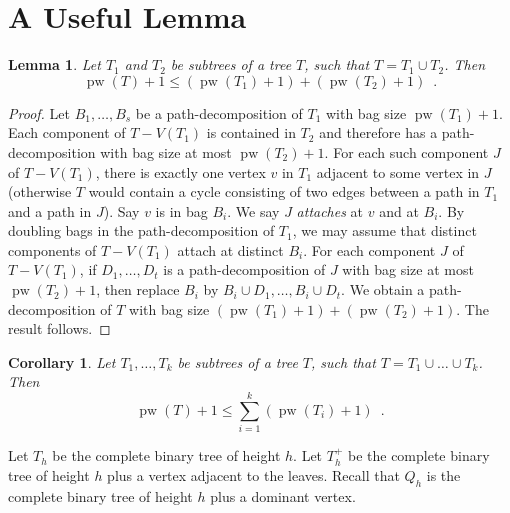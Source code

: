 \documentclass[a4paper,11pt]{article}
\DeclareMathOperator{\pw}{pw}
\theoremstyle{plain}
\newtheorem{lemma}[theorem]{Lemma}
\newtheorem{corollary}[theorem]{Corollary}
\theoremstyle{definition}
\begin{document}
%
%

\section{A Useful Lemma}

\begin{lemma}
Let $T_1$ and $T_2$ be subtrees of a tree $T$, such that $T=T_1\cup T_2$. Then 
$$\pw(T)+1\leq(\pw(T_1)+1)+(\pw(T_2)+1)\enspace.$$
\end{lemma}

\begin{proof}
Let $B_1,\dots,B_s$ be a path-decomposition of $T_1$ with bag size $\pw(T_1)+1$. 
Each component  of $T-V(T_1)$ is contained in $T_2$ and therefore has a path-decomposition  with bag size at most $\pw(T_2)+1$. For each such component $J$ of $T-V(T_1)$, there is exactly one vertex $v$ in $T_1$ adjacent to some vertex in $J$ (otherwise $T$ would contain a cycle consisting of two edges between a path in $T_1$ and a path in $J$). Say $v$ is in bag $B_i$. We say $J$ \emph{attaches} at $v$ and at $B_i$. By doubling bags in the path-decomposition of $T_1$, we may assume that distinct components of $T-V(T_1)$ attach at distinct $B_i$. For each component $J$ of $T-V(T_1)$, if $D_1,\dots,D_t$ is a path-decomposition of $J$ with bag size at most $\pw(T_2)+1$, then replace $B_i$ by $B_i\cup D_1,\dots,B_i\cup D_t$. We obtain a path-decomposition of $T$ with bag size $(\pw(T_1)+1)+(\pw(T_2)+1)$. The result follows. 
\end{proof}

\begin{corollary}
\label{SubtreeUnion}
Let $T_1,\dots,T_k$ be subtrees of a tree $T$, such that $T=T_1\cup\dots\cup T_k$. Then 
$$\pw(T)+1\leq\sum_{i=1}^k(\pw(T_i)+1)\enspace.$$
\end{corollary}


Let $T_h$ be the complete binary tree of height $h$. 
Let $T_h^+$ be the complete binary tree of height $h$ plus a vertex adjacent to the leaves. 
Recall that $Q_h$ is the complete binary tree of height $h$ plus a dominant vertex.
\end{document}
